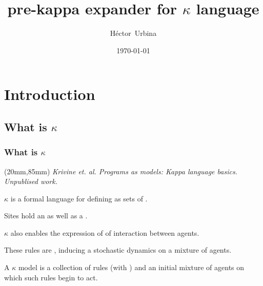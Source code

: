 \documentclass[xcolor=dvipsnames]{beamer}
\newenvironment{reference}[2]{%
    \begin{textblock*}{\textwidth}(#1,#2) 
            \footnotesize\it\bgroup\color{red!50!black}}{\egroup\end{textblock*}}
\begin{document}
\title[pre-$\kappa$ expander]
{pre-kappa expander for $\kappa$ language}
\author[hurbina]
{Héctor~Urbina}
\date
{\today}

\begin{frame}
  \titlepage
\end{frame}

\begin{frame}
  \tableofcontents
\end{frame}

\section{Introduction}
\subsection{What is $\kappa$}
\begin{frame}
  \frametitle{What is $\kappa$}
  \begin{reference}{20mm}{85mm}
    Krivine et. al.  \emph{Programs as models: Kappa language basics}. Unpublised work.
  \end{reference} 
  \begin{flushleft}
    $\kappa$ is a formal language for defining  as sets of .
    \pause
    \item Sites hold an  as well as a .
    \pause
    \item $\kappa$ also enables the expression of  of interaction between agents.
    \pause
    \item These rules are , inducing a stochastic dynamics on a mixture of agents.
    \pause
    \item A $\kappa$ model is a collection of rules (with ) and an initial mixture of agents on which such rules begin to act.
  \end{flushleft}
\end{frame}
\end{document}
